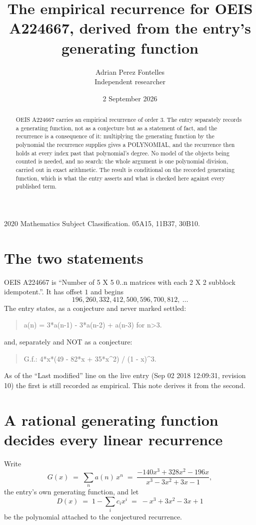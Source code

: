 \documentclass[11pt,a4paper]{article}
\title{The empirical recurrence for OEIS A224667, derived from the entry's generating function}
\author{Adrian Perez Fontelles\\ \small Independent researcher}
\date{2 September 2026}
\theoremstyle{plain}
\theoremstyle{definition}
\begin{document}
\maketitle

\begin{abstract}
OEIS A224667 carries an empirical recurrence of order $3$. The entry separately records a
generating function, not as a conjecture but as a statement of fact, and the recurrence is a
consequence of it: multiplying the generating function by the polynomial the recurrence
supplies gives a POLYNOMIAL, and the recurrence then holds at every index past that
polynomial's degree. No model of the objects being counted is needed, and no search: the
whole argument is one polynomial division, carried out in exact arithmetic. The result is
conditional on the recorded generating function, which is what the entry asserts and what is
checked here against every published term.
\end{abstract}

\noindent\small 2020 Mathematics Subject Classification. 05A15, 11B37, 30B10.\normalsize

\section{The two statements}

OEIS A224667 is ``Number of 5 X 5 0..n matrices with each 2 X 2 subblock idempotent.''. It has offset $1$ and begins
\[
196, 260, 332, 412, 500, 596, 700, 812,\ \dots
\]
The entry states, as a conjecture and never marked settled:
\begin{quote}
a(n) = 3*a(n-1) - 3*a(n-2) + a(n-3) for n>3.
\end{quote}
and, separately and NOT as a conjecture:
\begin{quote}
G.f.: 4*x*(49 - 82*x + 35*x\^{}2) / (1 - x)\^{}3.
\end{quote}
As of the ``Last modified'' line on the live entry (Sep 02 2018 12:09:31, revision 10) the first is still
recorded as empirical. This note derives it from the second.

\section{A rational generating function decides every linear recurrence}

Write
\[
G(x)\;=\;\sum_{n}a(n)\,x^{n}\;=\;\frac{- 140 x^{3} + 328 x^{2} - 196 x}{x^{3} - 3 x^{2} + 3 x - 1},
\]
the entry's own generating function, and let
\[
D(x)\;=\;1-\sum_i c_i x^{i}\;=\;- x^{3} + 3 x^{2} - 3 x + 1
\]
be the polynomial attached to the conjectured recurrence.
\end{document}
